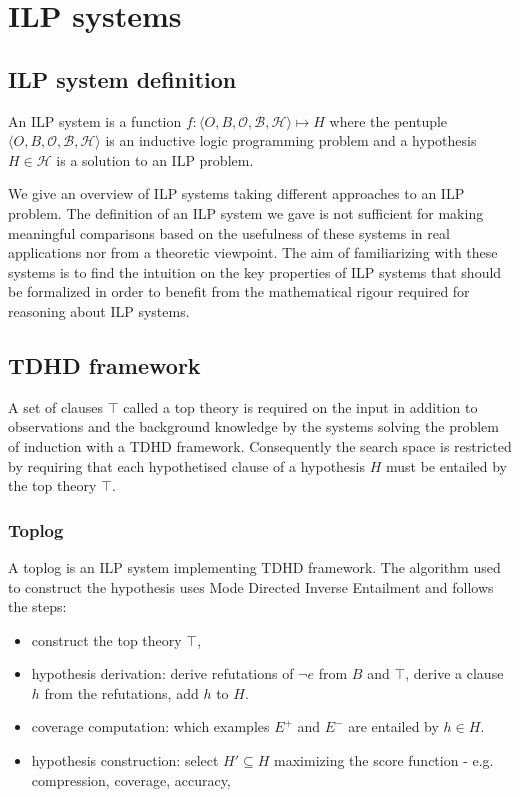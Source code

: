 \section{ILP systems}

\subsection{ILP system definition}
An ILP system is a function
$f:\langle O, B, \mathcal{O}, \mathcal{B}, \mathcal{H}\rangle \mapsto H$ where the pentuple $\langle O, B, \mathcal{O}, \mathcal{B}, \mathcal{H}\rangle$
is an inductive logic programming problem and a hypothesis $H \in \mathcal{H}$ is a solution to an ILP problem.

We give an overview of ILP systems taking different approaches to an ILP problem. The definition of an ILP system we gave is not sufficient for making meaningful comparisons based on the usefulness of these systems in real applications nor from a theoretic viewpoint. The aim of familiarizing with these systems is to find the intuition on the key properties of ILP systems that should be formalized in order to benefit from the mathematical rigour required for reasoning about ILP systems.

\subsection{TDHD framework\cite{muggleton2008}}
A set of clauses $\top$ called a top theory is required on the input in addition to observations and the background knowledge by the systems solving the problem of induction with a TDHD framework. Consequently the search space is restricted by requiring that each hypothetised clause of a hypothesis $H$ must be entailed by the top theory $\top$.

\subsubsection{Toplog\cite{muggleton2008}}
A toplog is an ILP system implementing TDHD framework. The algorithm used to construct the hypothesis uses Mode Directed Inverse Entailment and follows the steps:
\begin{itemize}
\item construct the top theory $\top$,
\item hypothesis derivation: derive refutations of $\neg e$ from $B$ and $\top$, derive a clause $h$ from the refutations, add $h$ to $H$.
\item coverage computation: which examples $E^+$ and $E^-$ are entailed by $h \in H$.
\item hypothesis construction: select $H' \subseteq H$ maximizing the score function - e.g. compression, coverage, accuracy,
\end{itemize}

